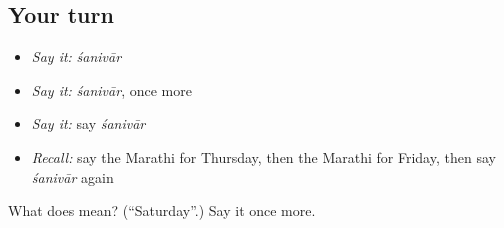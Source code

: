 \subsection*{Your turn}
\begin{itemize}
\raggedright
  \item \emph{Say it:} \emph{śanivār}
  \item \emph{Say it:} \emph{śanivār}, once more
  \item \emph{Say it:} say \emph{śanivār}
  \item \emph{Recall:} say the Marathi for Thursday, then the Marathi for Friday, then say \emph{śanivār} again
\end{itemize}

\begin{tcolorbox}[breakable,colback=teal!4,colframe=teal!35!black,title={Before you move on}]
What does  mean? (\textquotedblleft{}Saturday\textquotedblright{}.) Say it once more.
\end{tcolorbox}
